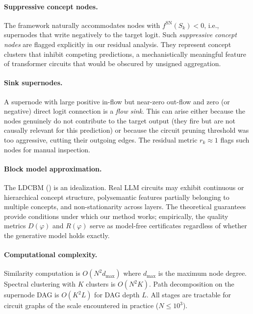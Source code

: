 \documentclass[11pt]{article}
\newcommand{\1}{\mathbbm{1}}
\begin{document}
\paragraph{Suppressive concept nodes.}
The framework naturally accommodates nodes with $f^{\mathrm{SN}}(S_k) < 0$, i.e., supernodes that write negatively to the target logit.
Such \emph{suppressive concept nodes} are flagged explicitly in our residual analysis.
They represent concept clusters that inhibit competing predictions, a mechanistically meaningful feature of transformer circuits that would be obscured by unsigned aggregation.

\paragraph{Sink supernodes.}
A supernode with large positive in-flow but near-zero out-flow and zero (or negative) direct logit connection is a \emph{flow sink}.
This can arise either because the nodes genuinely do not contribute to the target output (they fire but are not causally relevant for this prediction) or because the circuit pruning threshold was too aggressive, cutting their outgoing edges.
The residual metric $r_k \approx 1$ flags such nodes for manual inspection.

\paragraph{Block model approximation.}
The LDCBM () is an idealization.
Real LLM circuits may exhibit continuous or hierarchical concept structure, polysemantic features partially belonging to multiple concepts, and non-stationarity across layers.
The theoretical guarantees provide conditions under which our method works; empirically, the quality metrics $D(\varphi)$ and $R(\varphi)$ serve as model-free certificates regardless of whether the generative model holds exactly.

\paragraph{Computational complexity.}
Similarity computation is $O(N^2 d_{\max})$ where $d_{\max}$ is the maximum node degree.
Spectral clustering with $K$ clusters is $O(N^2 K)$.
Path decomposition on the supernode DAG is $O(K^2 L)$ for DAG depth $L$.
All stages are tractable for circuit graphs of the scale encountered in practice ($N \le 10^3$).
\end{document}
